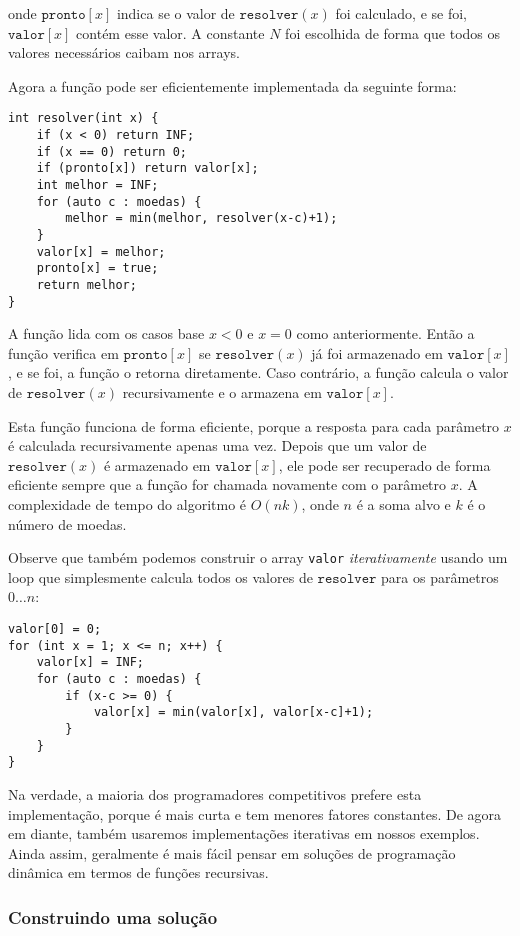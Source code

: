 onde $\texttt{pronto}[x]$ indica
se o valor de $\texttt{resolver}(x)$ foi calculado,
e se foi, $\texttt{valor}[x]$
contém esse valor.
A constante $N$ foi escolhida de forma
que todos os valores necessários caibam nos arrays.

Agora a função pode ser eficientemente
implementada da seguinte forma:

\begin{lstlisting}
int resolver(int x) {
    if (x < 0) return INF;
    if (x == 0) return 0;
    if (pronto[x]) return valor[x];
    int melhor = INF;
    for (auto c : moedas) {
        melhor = min(melhor, resolver(x-c)+1);
    }
    valor[x] = melhor;
    pronto[x] = true;
    return melhor;
}
\end{lstlisting}

A função lida com os casos base
$x<0$ e $x=0$ como anteriormente.
Então a função verifica em
$\texttt{pronto}[x]$ se
$\texttt{resolver}(x)$ já foi armazenado
em $\texttt{valor}[x]$,
e se foi, a função o retorna diretamente.
Caso contrário, a função calcula o valor
de $\texttt{resolver}(x)$
recursivamente e o armazena em $\texttt{valor}[x]$.

Esta função funciona de forma eficiente,
porque a resposta para cada parâmetro $x$
é calculada recursivamente apenas uma vez.
Depois que um valor de $\texttt{resolver}(x)$ é armazenado em $\texttt{valor}[x]$,
ele pode ser recuperado de forma eficiente sempre que a
função for chamada novamente com o parâmetro $x$.
A complexidade de tempo do algoritmo é $O(nk)$,
onde $n$ é a soma alvo e $k$ é o número de moedas.

Observe que também podemos construir o array \texttt{valor}
\emph{iterativamente} usando
um loop que simplesmente calcula todos os valores
de $\texttt{resolver}$ para os parâmetros $0 \ldots n$:
\begin{lstlisting}
valor[0] = 0;
for (int x = 1; x <= n; x++) {
    valor[x] = INF;
    for (auto c : moedas) {
        if (x-c >= 0) {
            valor[x] = min(valor[x], valor[x-c]+1);
        }
    }
}
\end{lstlisting}

Na verdade, a maioria dos programadores competitivos prefere esta
implementação, porque é mais curta e tem
menores fatores constantes.
De agora em diante, também usaremos implementações iterativas
em nossos exemplos.
Ainda assim, geralmente é mais fácil pensar em
soluções de programação dinâmica
em termos de funções recursivas.


\subsubsection{Construindo uma solução}

